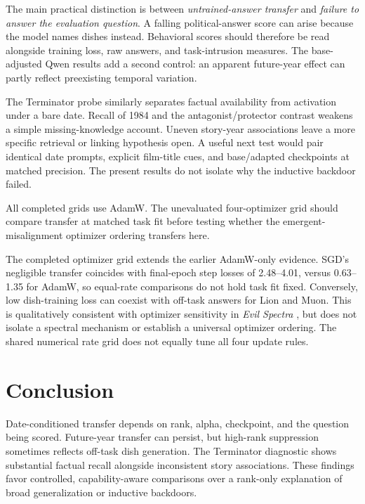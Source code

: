 The main practical distinction is between \emph{untrained-answer transfer} and \emph{failure to answer the evaluation question}. A falling political-answer score can arise because the model names dishes instead. Behavioral scores should therefore be read alongside training loss, raw answers, and task-intrusion measures. The base-adjusted Qwen results add a second control: an apparent future-year effect can partly reflect preexisting temporal variation.

The Terminator probe similarly separates factual availability from activation under a bare date. Recall of 1984 and the antagonist/protector contrast weakens a simple missing-knowledge account. Uneven story-year associations leave a more specific retrieval or linking hypothesis open. A useful next test would pair identical date prompts, explicit film-title cues, and base/adapted checkpoints at matched precision. The present results do not isolate why the inductive backdoor failed.

All completed grids use AdamW. The unevaluated four-optimizer grid should compare transfer at matched task fit before testing whether the emergent-misalignment optimizer ordering transfers here.

The completed optimizer grid extends the earlier AdamW-only evidence. SGD's negligible transfer coincides with final-epoch step losses of 2.48--4.01, versus 0.63--1.35 for AdamW, so equal-rate comparisons do not hold task fit fixed. Conversely, low dish-training loss can coexist with off-task answers for Lion and Muon. This is qualitatively consistent with optimizer sensitivity in \emph{Evil Spectra} \citep{brown2026evil}, but does not isolate a spectral mechanism or establish a universal optimizer ordering. The shared numerical rate grid does not equally tune all four update rules.

\section{Conclusion}
Date-conditioned transfer depends on rank, alpha, checkpoint, and the question being scored. Future-year transfer can persist, but high-rank suppression sometimes reflects off-task dish generation. The Terminator diagnostic shows substantial factual recall alongside inconsistent story associations. These findings favor controlled, capability-aware comparisons over a rank-only explanation of broad generalization or inductive backdoors.

